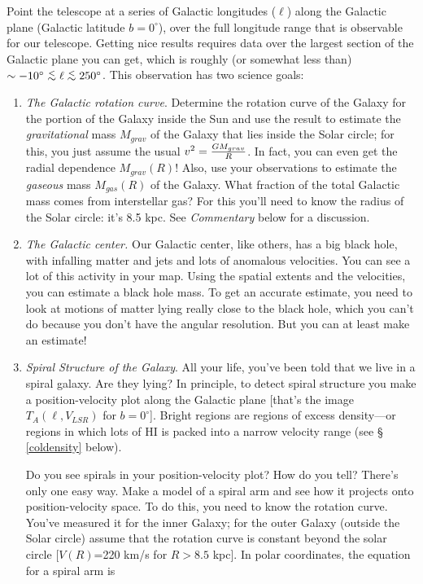 \documentclass[psfig,preprint]{aastex}
\begin{document}
	Point the telescope at a series of Galactic longitudes ($\ell$)
along the Galactic plane (Galactic latitude $b = 0^\circ$), over the
full longitude range that is observable for our telescope.  Getting nice
results requires data over the largest section of the Galactic plane you
can get, which is roughly (or somewhat less than) $\sim -10^\circ \simlt
\ell \simlt 250^\circ$. This observation has two science goals:
\begin{enumerate}

	\item {\it The Galactic rotation curve}. Determine the rotation
curve of the Galaxy for the portion of the Galaxy inside the Sun and use
the result to estimate the {\it gravitational} mass $M_{grav}$ of the
Galaxy that lies inside the Solar circle; for this, you just assume the
usual $v^2 = {G M_{grav} \over R}$.  In fact, you can even get the
radial dependence $M_{grav}(R)$! Also, use your observations to estimate
the {\it gaseous} mass $M_{gas}(R)$ of the Galaxy.  What fraction of the
total Galactic mass comes from interstellar gas? For this you'll need to
know the radius of the Solar circle: it's 8.5 kpc.  See {\it Commentary}
below for a discussion. 

\item {\it The Galactic center.} Our Galactic center, like others, has a
  big black hole, with infalling matter and jets and lots of anomalous
  velocities. You can see a lot of this activity in  your map. Using the
  spatial extents and the velocities, you can estimate a black hole
  mass. To get an accurate estimate, you need to look at motions of
  matter lying really close to the black hole, which you can't do
  because you don't have the angular resolution. But you can at least
  make an estimate!

	\item {\it Spiral Structure of the Galaxy}. All your life,
you've been told that we live in a spiral galaxy.  Are they lying? In
principle, to detect spiral structure you make a position-velocity plot
along the Galactic plane [that's the image $T_A(\ell,V_{LSR})$ for
$b=0^\circ$].  Bright regions are regions of excess density---or regions in
which lots of HI is packed into a narrow velocity range (see \S
\ref{coldensity} below). 

	Do you see spirals in your position-velocity plot? How do you
tell? There's only one easy way.  Make a model of a spiral arm and see
how it projects onto position-velocity space.  To do this, you need to
know the rotation curve.  You've measured it for the inner Galaxy; for
the outer Galaxy (outside the Solar circle) assume that the rotation
curve is constant beyond the solar circle [$V(R)$=220 km/s for $R > 8.5$
kpc].  In polar coordinates, the equation for a spiral arm is


\end{enumerate}
\end{document}
